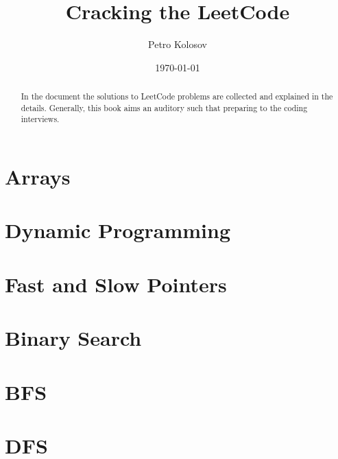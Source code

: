 \documentclass[12pt,letterpaper,oneside,reqno]{amsart}
\title[Cracking the LeetCode]{Cracking the LeetCode}
\author[Petro Kolosov]{Petro Kolosov}
\date{\today}
\begin{document}
    \begin{abstract}
        In the document the solutions to LeetCode problems are collected and explained in the details.
        Generally, this book aims an auditory such that preparing to the coding interviews.
    \end{abstract}
    \maketitle
    \tableofcontents


    \section{Arrays}\label{sec:arrays}


    \section{Dynamic Programming}\label{sec:dynamic-programming}


    \section{Fast and Slow Pointers}\label{sec:fast-and-slow-pointers}


    \section{Binary Search}\label{sec:binary-search}


    \section{BFS}\label{sec:bfs}


    \section{DFS}\label{sec:dfs}

    
    
\end{document}
